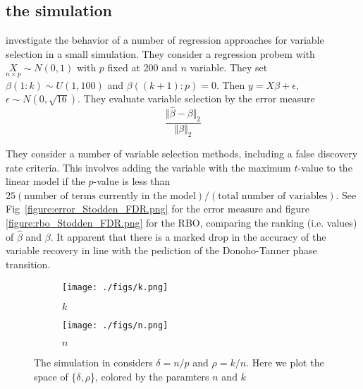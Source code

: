\subsection{the simulation}
\cite{Donoho.and.Stodden.2006} investigate the behavior of a number of
regression approaches for variable selection in a small simulation.  They consider a regression probem with 
$\underset{n\times p}{X}\sim N(0,1)$ with $p$ fixed at 200 and $n$ variable.
They  set $\beta(1:k) \sim U(1,100)$ and $\beta((k+1):p) =0$. Then  $y= X\beta + \epsilon$, $\epsilon \sim
N(0,\sqrt{16})$. They evaluate variable selection by the error measure 
$$\frac{\Vert\hat{\beta}-\beta\Vert_2}{\Vert\beta\Vert_2}$$

They consider a number of variable selection methods, including a false discovery rate criteria. This involves adding
the variable with the maximum $t$-value to the linear model if the $p$-value is less than 
$25(\text{number of  terms  currently  in  the  model})/(\text{total  number  of  variables})$.  
See Fig~\ref{figure:error_Stodden_FDR.png} for the error measure and
figure \ref{figure:rbo_Stodden_FDR.png} for the RBO, comparing the ranking (i.e. values) of $\hat{\beta}$ and $\beta$.
It apparent that there is a marked drop in the accuracy of the variable recovery in line with the pediction of the
Donoho-Tanner phase transition.

\begin{figure}[tbhp] 
    \begin{subfigure} [b]{0.5\linewidth}
      \centering
      \texttt{[image: ./figs/k.png]}
      \caption{$k$}
      \label{figure:k.png}
    \end{subfigure} 
    \begin{subfigure}[b]{0.5\linewidth}
      \centering
      \texttt{[image: ./figs/n.png]}
      \caption{$n$}
      \label{figure:n.png}
    \end{subfigure} 
    \caption{The simulation in  considers $\delta = n/p$ and $\rho =k/n$. Here we plot the
      space of $\{ \delta, \rho$\}, colored  by the paramters $n$ and $k$}
\end{figure}


